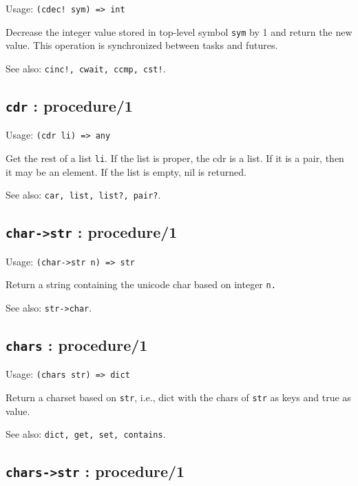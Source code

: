 \documentclass[
]{article}
\newcommand{\passthrough}[1]{#1}
\begin{document}
Usage: \passthrough{\lstinline"(cdec! sym) => int"}

Decrease the integer value stored in top-level symbol
\passthrough{\lstinline!sym!} by 1 and return the new value. This
operation is synchronized between tasks and futures.

See also: \passthrough{\lstinline"cinc!, cwait, ccmp, cst!"}.

\hypertarget{cdr-procedure1-1}{%
\subsection{\texorpdfstring{\texttt{cdr} :
procedure/1}{cdr : procedure/1}}\label{cdr-procedure1-1}}

Usage: \passthrough{\lstinline!(cdr li) => any!}

Get the rest of a list \passthrough{\lstinline!li!}. If the list is
proper, the cdr is a list. If it is a pair, then it may be an element.
If the list is empty, nil is returned.

See also: \passthrough{\lstinline!car, list, list?, pair?!}.

\hypertarget{char-str-procedure1-1}{%
\subsection{\texorpdfstring{\texttt{char-\textgreater{}str} :
procedure/1}{char-\textgreater str : procedure/1}}\label{char-str-procedure1-1}}

Usage: \passthrough{\lstinline!(char->str n) => str!}

Return a string containing the unicode char based on integer
\passthrough{\lstinline!n.!}

See also: \passthrough{\lstinline!str->char!}.

\hypertarget{chars-procedure1-1}{%
\subsection{\texorpdfstring{\texttt{chars} :
procedure/1}{chars : procedure/1}}\label{chars-procedure1-1}}

Usage: \passthrough{\lstinline!(chars str) => dict!}

Return a charset based on \passthrough{\lstinline!str!}, i.e., dict with
the chars of \passthrough{\lstinline!str!} as keys and true as value.

See also: \passthrough{\lstinline!dict, get, set, contains!}.

\hypertarget{chars-str-procedure1-1}{%
\subsection{\texorpdfstring{\texttt{chars-\textgreater{}str} :
procedure/1}{chars-\textgreater str : procedure/1}}\label{chars-str-procedure1-1}}
\end{document}
